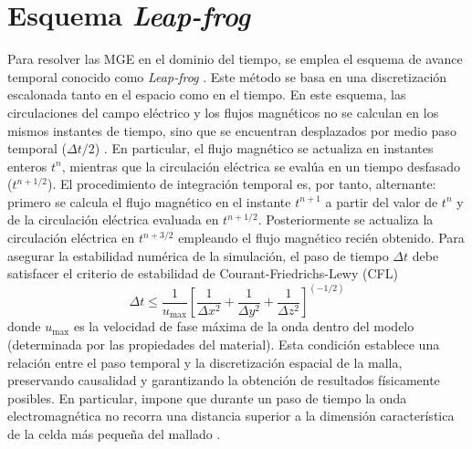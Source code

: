 
\section{Esquema \textit{Leap-frog}}
\label{section:Tiempo}

Para resolver las MGE en el dominio del tiempo, se emplea el esquema de avance temporal conocido como \textit{Leap-frog} \cite{clemensDiscreteElectromagnetismFinite2001}. Este método se basa en una discretización escalonada tanto en el espacio como en el tiempo. En este esquema, las circulaciones del campo eléctrico y los flujos magnéticos no se calculan en los mismos instantes de tiempo, sino que se encuentran desplazados por medio paso temporal ($\Delta t/2$) \cite{dassaultsystemesUnderstandingTimeDomain2010}. En particular, el flujo magnético se actualiza en instantes enteros $t^n$, mientras que la circulación eléctrica se evalúa en un tiempo desfasado ($t^{n+1/2}$). El procedimiento de integración temporal es, por tanto, alternante: primero se calcula el flujo magnético en el instante $t^{n+1}$ a partir del valor de $t^n$ y de la circulación eléctrica evaluada en $t^{n+1/2}$. Posteriormente se actualiza la circulación eléctrica en $t^{n+3/2}$ empleando el flujo magnético recién obtenido.  Para asegurar la estabilidad numérica de la simulación, el paso de tiempo $\Delta t$ debe satisfacer el criterio de estabilidad de Courant-Friedrichs-Lewy (CFL) \cite{dassaultsystemesUnderstandingTimeDomain2010}
%
\begin{equation}
	\Delta t\leq \frac{1}{u_{\text{max}}}\left[\frac{1}{\Delta x^2}+\frac{1}{\Delta y^2}+\frac{1}{\Delta z^2}\right]^{(-1/2)}
\end{equation}
%
donde $u_{\text{max}}$ es la velocidad de fase máxima de la onda dentro del modelo (determinada por las propiedades del material). Esta condición establece una relación entre el paso temporal y la discretización espacial de la malla, preservando causalidad y garantizando la obtención de resultados físicamente posibles. En particular, impone que durante un paso de tiempo la onda electromagnética no recorra una distancia superior a la dimensión característica de la celda más pequeña del mallado \cite{dassaultsystemesUnderstandingTimeDomain2010}.

